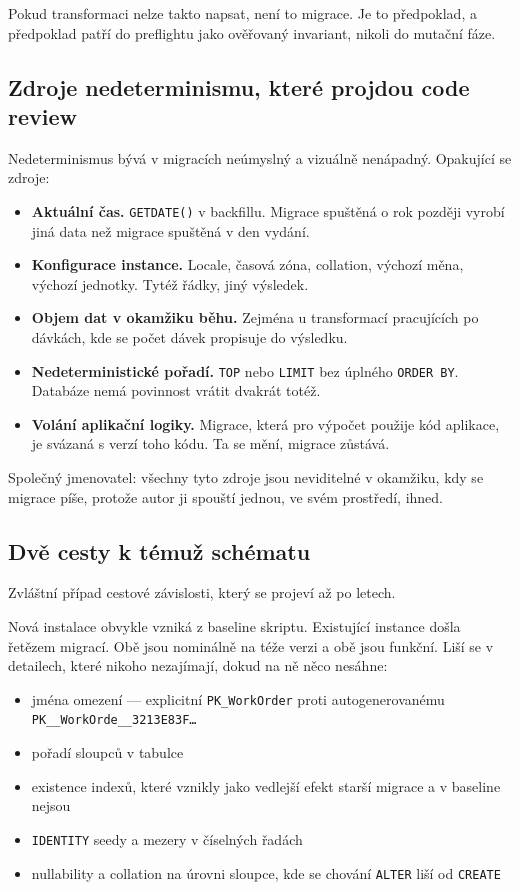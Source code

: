 \documentclass[11pt,a4paper]{article}
\newcounter{invariant}
\begin{document}
Pokud transformaci nelze takto napsat, není to migrace. Je to předpoklad,
a předpoklad patří do preflightu jako ověřovaný invariant, nikoli do
mutační fáze.

\subsection{Zdroje nedeterminismu, které projdou code review}
\label{sub:nedeterminismus}

Nedeterminismus bývá v migracích neúmyslný a vizuálně nenápadný.
Opakující se zdroje:

\begin{itemize}[leftmargin=1.4em]
\item \textbf{Aktuální čas.} \texttt{GETDATE()} v backfillu. Migrace
      spuštěná o rok později vyrobí jiná data než migrace spuštěná
      v den vydání.
\item \textbf{Konfigurace instance.} Locale, časová zóna, collation,
      výchozí měna, výchozí jednotky. Tytéž řádky, jiný výsledek.
\item \textbf{Objem dat v okamžiku běhu.} Zejména u transformací
      pracujících po dávkách, kde se počet dávek propisuje do výsledku.
\item \textbf{Nedeterministické pořadí.} \texttt{TOP} nebo \texttt{LIMIT}
      bez úplného \texttt{ORDER BY}. Databáze nemá povinnost vrátit
      dvakrát totéž.
\item \textbf{Volání aplikační logiky.} Migrace, která pro výpočet
      použije kód aplikace, je svázaná s verzí toho kódu. Ta se mění,
      migrace zůstává.
\end{itemize}

Společný jmenovatel: všechny tyto zdroje jsou neviditelné v okamžiku,
kdy se migrace píše, protože autor ji spouští jednou, ve svém prostředí,
ihned.

\subsection{Dvě cesty k témuž schématu}
\label{sub:freshvsupgrade}

Zvláštní případ cestové závislosti, který se projeví až po letech.

Nová instalace obvykle vzniká z baseline skriptu. Existující instance
došla řetězem migrací. Obě jsou nominálně na téže verzi a obě jsou
funkční. Liší se v detailech, které nikoho nezajímají, dokud na ně něco
nesáhne:

\begin{itemize}[leftmargin=1.4em]
\item jména omezení --- explicitní \texttt{PK\_WorkOrder} proti
      autogenerovanému \texttt{PK\_\_WorkOrde\_\_3213E83F\dots}
\item pořadí sloupců v tabulce
\item existence indexů, které vznikly jako vedlejší efekt starší migrace
      a v baseline nejsou
\item \texttt{IDENTITY} seedy a mezery v číselných řadách
\item nullability a collation na úrovni sloupce, kde se chování
      \texttt{ALTER} liší od \texttt{CREATE}
\end{itemize}
\end{document}
